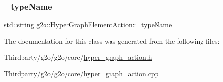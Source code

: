 \mbox{\label{classg2o_1_1_hyper_graph_element_action_ae05082e218d213f8db5de7a79769f97c}} 
\subsubsection{\texorpdfstring{\+\_\+type\+Name}{\_typeName}}
{\footnotesize\ttfamily std\+::string g2o\+::\+Hyper\+Graph\+Element\+Action\+::\+\_\+type\+Name\hspace{0.3cm}{\ttfamily [protected]}}



The documentation for this class was generated from the following files\+:\begin{DoxyCompactItemize}
\item 
Thirdparty/g2o/g2o/core/\mbox{\hyperlink{hyper__graph__action_8h}{hyper\+\_\+graph\+\_\+action.\+h}}\item 
Thirdparty/g2o/g2o/core/\mbox{\hyperlink{hyper__graph__action_8cpp}{hyper\+\_\+graph\+\_\+action.\+cpp}}\end{DoxyCompactItemize}
